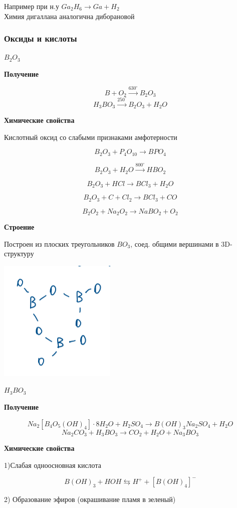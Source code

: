 \documentclass[14pt,a4paper]{scrartcl}
\begin{document}
Например при н.у $Ga_2H_6 \rightarrow Ga + H_2$\\
Химия дигаллана аналогична диборановой

\subsubsection{Оксиды и кислоты}

$B_2O_3$

\textbf{Получение}

$$B + O_2 \xrightarrow{630^{\circ}} B_2O_3$$
$$H_3BO_3 \xrightarrow{250^{\circ}} B_2O_3 + H_2O$$

\textbf{Химические свойства}

Кислотный оксид со слабыми признаками амфотерности

$$B_2O_3 + P_4O_{10} \rightarrow BPO_4$$

$$B_2O_3 + H_2O \xrightarrow{800^{\circ}} HBO_2$$

$$B_2O_3 + HCl \rightarrow BCl_3 + H_2O$$

$$B_2O_3 + C + Cl_2 \rightarrow BCl_3 + CO$$

$$B_2O_2 + Na_2O_2 \rightarrow NaBO_2 + O_2$$

\textbf{Строение}

Построен из плоских треугольников $BO_3$, соед. общими вершинами в 3D-структуру

\includegraphics{11v5.png}

$H_3BO_3$

\textbf{Получение}

$$Na_2[B_4O_5(OH)_4]\cdot 8H_2O + H_2SO_4 \rightarrow B(OH)_3 Na_2SO_4 + H_2O$$
$$Na_2CO_3 + H_3BO_3 \rightarrow CO_2 + H_2O + Na_3BO_3$$

\textbf{Химические свойства}

1)Слабая одноосновная кислота

$$B(OH)_3 + HOH \leftrightarrows H^+ + [B(OH)_4]^-$$

2) Образование эфиров (окрашивание пламя в зеленый)
\end{document}
